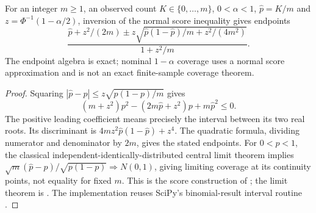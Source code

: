 \begin{proposition}
\label{sm:wilson}
For an integer \(m\geq1\), an observed count \(K\in\{0,\ldots,m\}\),
\(0<\alpha<1\), \(\hat p=K/m\) and
\(z=\Phi^{-1}(1-\alpha/2)\), inversion
of the normal score inequality gives endpoints
\[
 \frac{\hat p+z^2/(2m)\ \mathord\pm\
 z\sqrt{\hat p(1-\hat p)/m+z^2/(4m^2)}}{1+z^2/m}.
\]
The endpoint algebra is exact; nominal \(1-\alpha\) coverage uses a normal
score approximation and is not an exact finite-sample coverage theorem.
\end{proposition}
\begin{proof}
Squaring \(|\hat p-p|\leq z\sqrt{p(1-p)/m}\) gives
\[
 (m+z^2)p^2-(2m\hat p+z^2)p+m\hat p^2\leq0.
\]
The positive leading coefficient means precisely the interval between its
two real roots. Its discriminant is
\(4mz^2\hat p(1-\hat p)+z^4\). The quadratic formula, dividing
numerator and denominator by \(2m\), gives the stated endpoints. For
\(0<p<1\), the classical independent-identically-distributed central
limit theorem implies
\(\sqrt m(\hat p-p)/\sqrt{p(1-p)}\Rightarrow N(0,1)\), giving limiting
coverage at its continuity points, not equality for fixed \(m\).
This is the score construction of \citet{wilson1927}; the limit theorem is
\citet[Theorem 3.4.1]{durrett2019}. The implementation reuses
SciPy's binomial-result interval routine \citep{scipyBinomtest}.
\end{proof}

